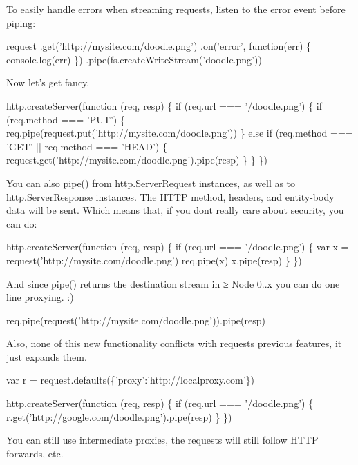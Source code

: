 To easily handle errors when streaming requests, listen to the {\ttfamily error} event before piping\+:


\begin{DoxyCode}
request
  .get('http://mysite.com/doodle.png')
  .on('error', function(err) \{
    console.log(err)
  \})
  .pipe(fs.createWriteStream('doodle.png'))
\end{DoxyCode}


Now let’s get fancy.


\begin{DoxyCode}
http.createServer(function (req, resp) \{
  if (req.url === '/doodle.png') \{
    if (req.method === 'PUT') \{
      req.pipe(request.put('http://mysite.com/doodle.png'))
    \} else if (req.method === 'GET' || req.method === 'HEAD') \{
      request.get('http://mysite.com/doodle.png').pipe(resp)
    \}
  \}
\})
\end{DoxyCode}


You can also {\ttfamily pipe()} from {\ttfamily http.\+Server\+Request} instances, as well as to {\ttfamily http.\+Server\+Response} instances. The H\+T\+TP method, headers, and entity-\/body data will be sent. Which means that, if you don\textquotesingle{}t really care about security, you can do\+:


\begin{DoxyCode}
http.createServer(function (req, resp) \{
  if (req.url === '/doodle.png') \{
    var x = request('http://mysite.com/doodle.png')
    req.pipe(x)
    x.pipe(resp)
  \}
\})
\end{DoxyCode}


And since {\ttfamily pipe()} returns the destination stream in ≥ Node 0..\+x you can do one line proxying. \+:)


\begin{DoxyCode}
req.pipe(request('http://mysite.com/doodle.png')).pipe(resp)
\end{DoxyCode}


Also, none of this new functionality conflicts with requests previous features, it just expands them.


\begin{DoxyCode}
var r = request.defaults(\{'proxy':'http://localproxy.com'\})

http.createServer(function (req, resp) \{
  if (req.url === '/doodle.png') \{
    r.get('http://google.com/doodle.png').pipe(resp)
  \}
\})
\end{DoxyCode}


You can still use intermediate proxies, the requests will still follow H\+T\+TP forwards, etc.

